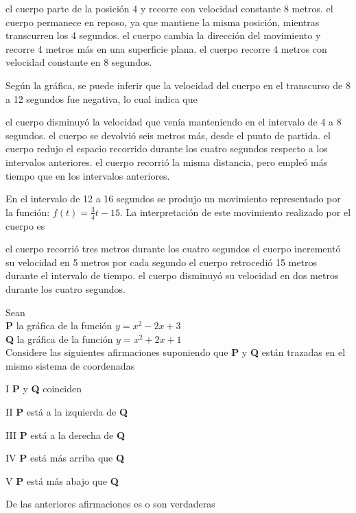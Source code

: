 \documentclass[10pt,letterpaper,addpoints]{exam}
\begin{document}
\begin{questions}
\begin{choices}
\choice el cuerpo parte de la posición 4 y recorre con velocidad constante 8 metros.
\CorrectChoice el cuerpo permanece en reposo, ya que mantiene la misma posición, mientras transcurren los 4 segundos.
\choice el cuerpo cambia la dirección del movimiento y recorre 4 metros más en una superficie plana.
\choice el cuerpo recorre 4 metros con velocidad constante en 8 segundos.
\end{choices}
\question
Según la gráfica, se puede inferir que la velocidad del cuerpo en el transcurso de 8 a 12 segundos fue negativa, lo cual indica que
\begin{choices}
\choice el cuerpo disminuyó la velocidad que venía manteniendo en el intervalo de 4 a 8 segundos.
\CorrectChoice el cuerpo se devolvió seis metros más, desde el punto de partida.
\choice el cuerpo redujo el espacio recorrido durante los cuatro segundos respecto a los intervalos anteriores.
\choice el cuerpo recorrió la misma distancia, pero empleó más tiempo que en los intervalos anteriores.
\end{choices}
\question \label{preg-3}
En el intervalo de 12 a 16 segundos se produjo un movimiento representado por la función: $ f(t)=\frac{3}{4}t-15 $. La interpretación de este movimiento realizado por el cuerpo es
\begin{choices}
\CorrectChoice el cuerpo recorrió tres metros durante los cuatro segundos
\choice el cuerpo incrementó su velocidad en 5 metros por cada segundo
\choice el cuerpo retrocedió 15 metros durante el intervalo de tiempo.
\choice el cuerpo disminuyó su velocidad en dos metros durante los cuatro segundos.
\end{choices}
\question
Sean\\
  \textbf{P} la gráfica de la función $ y=x^2-2x+3 $\\
  \textbf{Q} la gráfica de la función $ y=x^2+2x+1 $\\
  Considere las siguientes afirmaciones suponiendo que \textbf{P} y \textbf{Q} están trazadas en el mismo sistema de coordenadas
  \begin{itemize}\begin{multicols}{2}
    \item[I] \textbf{P} y \textbf{Q} coinciden
    \item[II] \textbf{P} está a la izquierda de \textbf{Q}
    \item[III] \textbf{P} está a la derecha de \textbf{Q}
    \item[IV] \textbf{P} está más arriba que \textbf{Q}
    \item[V] \textbf{P} está más abajo que \textbf{Q}
  \end{multicols}
  \end{itemize}
  De las anteriores afirmaciones es o son verdaderas


\end{questions}
\end{document}
